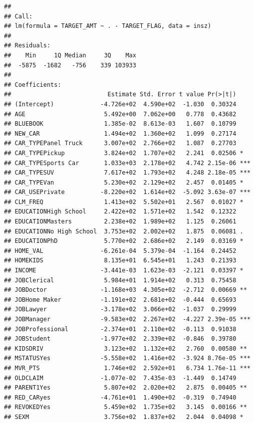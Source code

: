 \documentclass[]{article}
\begin{document}
\begin{verbatim}
## 
## Call:
## lm(formula = TARGET_AMT ~ . - TARGET_FLAG, data = insz)
## 
## Residuals:
##    Min     1Q Median     3Q    Max 
##  -5875  -1682   -756    339 103933 
## 
## Coefficients:
##                           Estimate Std. Error t value Pr(>|t|)    
## (Intercept)             -4.726e+02  4.590e+02  -1.030  0.30324    
## AGE                      5.492e+00  7.062e+00   0.778  0.43682    
## BLUEBOOK                 1.385e-02  8.613e-03   1.607  0.10799    
## NEW_CAR                  1.494e+02  1.360e+02   1.099  0.27174    
## CAR_TYPEPanel Truck      3.007e+02  2.766e+02   1.087  0.27703    
## CAR_TYPEPickup           3.824e+02  1.707e+02   2.241  0.02506 *  
## CAR_TYPESports Car       1.033e+03  2.178e+02   4.742 2.15e-06 ***
## CAR_TYPESUV              7.617e+02  1.793e+02   4.248 2.18e-05 ***
## CAR_TYPEVan              5.230e+02  2.129e+02   2.457  0.01405 *  
## CAR_USEPrivate          -8.220e+02  1.614e+02  -5.092 3.63e-07 ***
## CLM_FREQ                 1.413e+02  5.502e+01   2.567  0.01027 *  
## EDUCATIONHigh School     2.422e+02  1.571e+02   1.542  0.12322    
## EDUCATIONMasters         2.238e+02  1.989e+02   1.125  0.26061    
## EDUCATIONNo High School  3.753e+02  2.002e+02   1.875  0.06081 .  
## EDUCATIONPhD             5.770e+02  2.686e+02   2.149  0.03169 *  
## HOME_VAL                -6.261e-04  5.379e-04  -1.164  0.24452    
## HOMEKIDS                 8.135e+01  6.545e+01   1.243  0.21393    
## INCOME                  -3.441e-03  1.623e-03  -2.121  0.03397 *  
## JOBClerical              5.984e+01  1.914e+02   0.313  0.75458    
## JOBDoctor               -1.168e+03  4.305e+02  -2.712  0.00669 ** 
## JOBHome Maker           -1.191e+02  2.681e+02  -0.444  0.65693    
## JOBLawyer               -3.178e+02  3.066e+02  -1.037  0.29999    
## JOBManager              -9.583e+02  2.267e+02  -4.227 2.39e-05 ***
## JOBProfessional         -2.374e+01  2.110e+02  -0.113  0.91038    
## JOBStudent              -1.977e+02  2.339e+02  -0.846  0.39780    
## KIDSDRIV                 3.123e+02  1.132e+02   2.760  0.00580 ** 
## MSTATUSYes              -5.558e+02  1.416e+02  -3.924 8.76e-05 ***
## MVR_PTS                  1.746e+02  2.592e+01   6.734 1.76e-11 ***
## OLDCLAIM                -1.077e-02  7.435e-03  -1.449  0.14749    
## PARENT1Yes               5.807e+02  2.020e+02   2.875  0.00405 ** 
## RED_CARyes              -4.761e+01  1.490e+02  -0.319  0.74940    
## REVOKEDYes               5.459e+02  1.735e+02   3.145  0.00166 ** 
## SEXM                     3.756e+02  1.837e+02   2.044  0.04098 *  

\end{verbatim}
\end{document}
